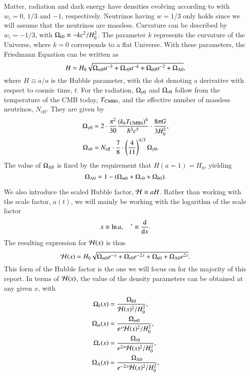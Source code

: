 Matter, radiation and dark energy have densities evolving according to  with $w_i=0,\,1/3$ and $-1$, respectively. Neutrinos having $w=1/3$ only holds since we will assume that the neutrinos are massless. Curvature can be described by $w_i=-1/3$, with $\Omega_{k0}\equiv -kc^2/H_0^2$. The parameter $k$ represents the curvature of the Universe, where $k=0$ corresponds to a flat Universe. With these parameters, the Friedmann Equation can be written as \citep[Eq. (3.14)]{Dodelson}  
\begin{equation}
    H = H_0 \sqrt{\Omega_{m0} a^{-3} + \Omega_{r0} a^{-4} + \Omega_{k0} a^{-2} + \Omega_{\Lambda 0}}, \label{eq:M1:theory:Friedmann_H_omegas}
\end{equation}
where $H\equiv\dot{a}/a$ is the Hubble parameter, with the dot denoting a derivative with respect to cosmic time, $t$. For the radiation, $\Omega_{\gamma 0}$ and $\Omega_{\nu 0}$ follow from the temperature of the CMB today, $T_\mathrm{CMB0}$, and the effective number of massless neutrinos, $N_\mathrm{eff}$. They are given by 
\begin{align}
    \Omega_{\gamma 0} &= 2 \cdot \frac{\pi^2}{30} \frac{(k_b T_\mathrm{CMB0})^4}{\hbar^3 c^5} \cdot \frac{8\pi G}{3H_0^2}, \label{eq:M1:theory:omega_gamma0_T} \\
    \Omega_{\nu 0} &= N_\mathrm{eff} \cdot \frac{7}{8} \cdot \left( \frac{4}{11} \right)^{4/3} \Omega_{\gamma 0}. \label{eq:M1:theory:omega_nu0_T}
\end{align}
%
%
The value of $\Omega_{\Lambda 0}$ is fixed by the requirement that $H(a=1)=H_0$, yielding 
\begin{equation}
    \Omega_{\Lambda 0} = 1 - (\Omega_{m0} + \Omega_{r0} + \Omega_{k0}). \label{eq:M1:theory:omega_lambda_0_normalization_condition}
\end{equation}
%

We also introduce the scaled Hubble factor, $\mathcal{H}\equiv aH$. Rather than working with the scale factor, $a(t)$, we will mainly be working with the logarithm of the scale factor 
\begin{equation} \label{eq:M1:theory:x_dx_definitions}
    x\equiv \ln a,\quad '\equiv \dv{x}. 
\end{equation}
%
The resulting expression for $\mathcal{H}(x)$ is thus  
\begin{equation} \label{eq:M1:theory:Hp_of_x}
    \mathcal{H}(x) = H_0 \sqrt{\Omega_{m0} e^{-x} + \Omega_{r0} e^{-2x} + \Omega_{k0} + \Omega_{\Lambda 0} e^{2x}}. 
\end{equation}
%
This form of the Hubble factor is the one we will focus on for the majority of this report. In terms of $\mathcal{H}(x)$, the value of the density parameters can be obtained at any given $x$, with 
\begin{align}
    \Omega_{k}(x) &= \frac{\Omega_{k0}}{\mathcal{H}(x)^2 / H_0^2}, \label{eq:M1:theory:omega_k_of_x}\\ 
    \Omega_{m}(x) &= \frac{\Omega_{m0}}{e^x \mathcal{H}(x)^2 / H_0^2}, \label{eq:M1:theory:omega_m_of_x}\\ 
    \Omega_{r}(x) &= \frac{\Omega_{r0}}{e^{2x} \mathcal{H}(x)^2 / H_0^2}, \label{eq:M1:theory:omega_r_of_x}\\ 
    \Omega_{\Lambda}(x) &= \frac{\Omega_{\Lambda 0}}{e^{-2x} \mathcal{H}(x)^2 / H_0^2}, \label{eq:M1:theory:omega_L_of_x}    
\end{align}

